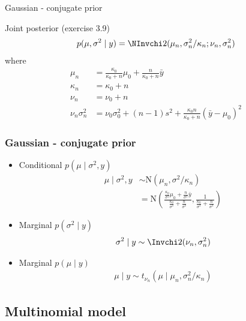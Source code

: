 \documentclass[10pt]{beamer}
\begin{document}
\begin{frame}{Gaussian - conjugate prior}

  Joint posterior (exercise 3.9)
    \begin{align*}
      p(\mu,\sigma^2 \mid y)=\NInvchi2(\mu_n,\sigma_n^2/\kappa_n;\nu_n,\sigma_n^2)
    \end{align*}
    where
    \begin{align*}
      \mu_n & = \frac{\kappa_0}{\kappa_0+n}\mu_0 + \frac{n}{\kappa_0+n}\bar{y} \\
      \kappa_n & = \kappa_0+n \\
      \nu_n & = \nu_0+n \\
      \nu_n\sigma_n^2 & =\nu_0\sigma_0^2 + (n-1)s^2 +
      \frac{\kappa_0 n}{\kappa_0+n}(\bar{y}-\mu_0)^2
    \end{align*}

\end{frame}

\begin{frame}
 \frametitle{Gaussian - conjugate prior}

  \begin{itemize}
 \item Conditional $p(\mu \mid \sigma^2,y)$
    \begin{align*}
     \mu \mid \sigma^2,y & \sim \mathrm{N}(\mu_n,\sigma^2/\kappa_n)\\
     & =  \mathrm{N}\left(\frac{\frac{\kappa_0}{\sigma^2}\mu_0+\frac{n}{\sigma^2}\bar{y}}{\frac{\kappa_0}{\sigma^2}+\frac{n}{\sigma^2}},\frac{1}{\frac{\kappa_0}{\sigma^2}+\frac{n}{\sigma^2}}\right)
    \end{align*}
  \vspace{-2mm}
  \pause
 \item Marginal $p(\sigma^2 \mid y)$
  \begin{align*}
      \sigma^2 \mid y \sim \Invchi2(\nu_n,\sigma_n^2)
   \end{align*}
    \vspace{-6mm}
  \pause
  \item Marginal $p(\mu \mid y)$
   \begin{align*}
     \mu \mid y \sim t_{\nu_n}(\mu \mid \mu_n,\sigma_n^2/\kappa_n)
   \end{align*}
  \end{itemize}

\end{frame}


\subsection{Multinomial model}
\end{document}
